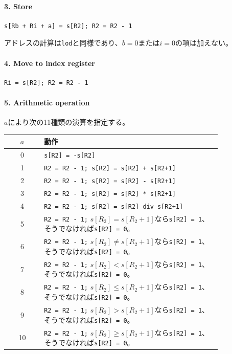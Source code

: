 \documentclass[dvipdfmx,a4j]{jbook}
\begin{document}
\paragraph{3. Store}
\begin{verbatim}
s[Rb + Ri + a] = s[R2]; R2 = R2 - 1
\end{verbatim}
アドレスの計算は\texttt{lod}と同様であり、$b=0$または$i=0$の項は加えない。

\paragraph{4. Move to index register}
\begin{verbatim}
Ri = s[R2]; R2 = R2 - 1
\end{verbatim}

\paragraph{5. Arithmetic operation}
\par $a$により次の11種類の演算を指定する。
\begin{longtable}{|c|p{0.83\linewidth}|}
\hline $a$ & 動作\\\hline
\endhead
0 & \texttt{s[R2] = -s[R2]}\\\hline
1 & \texttt{R2 = R2 - 1; s[R2] = s[R2] + s[R2+1]}\\\hline
2 & \texttt{R2 = R2 - 1; s[R2] = s[R2] - s[R2+1]}\\\hline
3 & \texttt{R2 = R2 - 1; s[R2] = s[R2] * s[R2+1]}\\\hline
4 & \texttt{R2 = R2 - 1; s[R2] = s[R2] div s[R2+1]}\\\hline
5 & \texttt{R2 = R2 - 1;} $s[R_2]=s[R_2+1]$なら\texttt{s[R2] = 1}、そうでなければ\texttt{s[R2] = 0}。\\\hline
6 & \texttt{R2 = R2 - 1;} $s[R_2]\ne s[R_2+1]$なら\texttt{s[R2] = 1}、そうでなければ\texttt{s[R2] = 0}。\\\hline
7 & \texttt{R2 = R2 - 1;} $s[R_2]<s[R_2+1]$なら\texttt{s[R2] = 1}、そうでなければ\texttt{s[R2] = 0}。\\\hline
8 & \texttt{R2 = R2 - 1;} $s[R_2]\le s[R_2+1]$なら\texttt{s[R2] = 1}、そうでなければ\texttt{s[R2] = 0}。\\\hline
9 & \texttt{R2 = R2 - 1;} $s[R_2]>s[R_2+1]$なら\texttt{s[R2] = 1}、そうでなければ\texttt{s[R2] = 0}。\\\hline
10 & \texttt{R2 = R2 - 1;} $s[R_2]\ge s[R_2+1]$なら\texttt{s[R2] = 1}、そうでなければ\texttt{s[R2] = 0}。\\\hline
\end{longtable}
\end{document}
